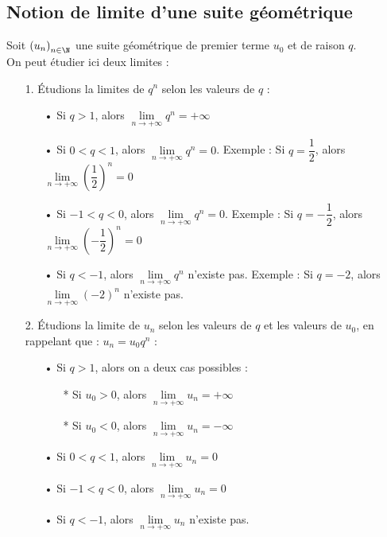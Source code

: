 \subsection{Notion de limite d'une suite géométrique}

Soit $\left(u_n\right)_{n \in \N}$ une suite géométrique de premier terme $u_0$ et de raison $q$. \\

On peut étudier ici deux limites : \\

\begin{itemize}
\item[1.] Étudions la limites de $q^n$ selon les valeurs de $q$ :
\begin{itemize}
\item[•] Si $q > 1$, alors $\lim\limits_{n \to +\infty} q^n = + \infty$ \\ 
\item[•] Si $0 < q < 1$, alors $\lim\limits_{n \to +\infty} q^n = 0$. Exemple : Si $q = \dfrac{1}{2}$, alors $\lim\limits_{n \to +\infty} \left(\dfrac{1}{2}\right)^n = 0$ \\ 
\item[•] Si $-1 < q < 0$, alors $\lim\limits_{n \to +\infty} q^n = 0$. Exemple : Si $q = -\dfrac{1}{2}$, alors $\lim\limits_{n \to +\infty} \left(-\dfrac{1}{2}\right)^n = 0$ \\ 
\item[•] Si $q < -1$, alors $\lim\limits_{n \to +\infty} q^n$ n'existe pas. Exemple : Si $q = -2$, alors $\lim\limits_{n \to +\infty} \left(-2\right)^n$ n'existe pas. \\ 
\end{itemize}
\item[2.] Étudions la limite de $u_n$ selon les valeurs de $q$ et les valeurs de $u_0$, en rappelant que  : $u_n = u_0q^n$ :
\begin{itemize}
\item[•] Si $q > 1$, alors on a deux cas possibles :
\begin{itemize}
\item[*] Si $u_0 > 0$, alors $\lim\limits_{n \to +\infty} u_n = +\infty$ \\
\item[*] Si $u_0 < 0$, alors $\lim\limits_{n \to +\infty} u_n = -\infty$ \\
\end{itemize}
\item[•] Si $0 < q < 1$, alors $\lim\limits_{n \to +\infty} u_n = 0$ \\
\item[•] Si $-1 < q < 0$, alors $\lim\limits_{n \to +\infty} u_n = 0$ \\
\item[•] Si $q < -1$, alors $\lim\limits_{n \to +\infty} u_n$ n'existe pas. 
\end{itemize}
\end{itemize}

